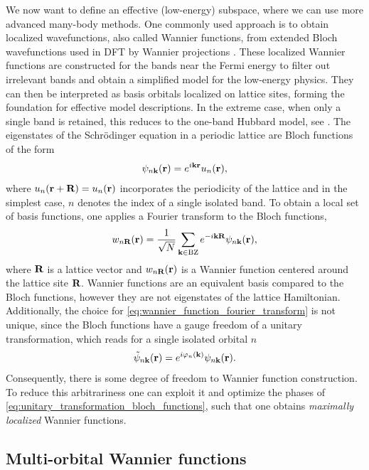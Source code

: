 \documentclass[../../main.tex]{subfiles}
\begin{document}
We now want to define an effective (low-energy) subspace, where we can use more advanced many-body methods. One commonly used approach is to obtain localized wavefunctions, also called Wannier functions, from extended Bloch wavefunctions used in DFT by Wannier projections \cite{Marzari1997}. These localized Wannier functions are constructed for the bands near the Fermi energy to filter out irrelevant bands and obtain a simplified model for the low-energy physics. They can then be interpreted as basis orbitals localized on lattice sites, forming the foundation for effective model descriptions. In the extreme case, when only a single band is retained, this reduces to the one-band Hubbard model, see . The eigenstates of the Schrödinger equation in a periodic lattice are Bloch functions of the form
\begin{align}
	\psi_{n\textbf{k}}(\textbf{r})=e^{i\textbf{kr}}u_n(\textbf{r}),
\end{align}
where $u_n(\textbf{r}+\textbf{R})=u_n(\textbf{r})$ incorporates the periodicity of the lattice and in the simplest case, $n$ denotes the index of a single isolated band. To obtain a local set of basis functions, one applies a Fourier transform to the Bloch functions,
\begin{align}\label{eq:wannier_function_fourier_transform}
	w_{n\textbf{R}}(\textbf{r})=\frac{1}{\sqrt{N}}\sum_{\textbf{k}\in\text{BZ}}e^{-i\textbf{kR}}\psi_{n\textbf{k}}(\textbf{r}),
\end{align}
where $\textbf{R}$ is a lattice vector and $w_{n\textbf{R}}(\textbf{r})$ is a Wannier function centered around the lattice site $\textbf{R}$. Wannier functions are an equivalent basis compared to the Bloch functions, however they are not eigenstates of the lattice Hamiltonian. Additionally, the choice for \eqref{eq:wannier_function_fourier_transform} is not unique, since the Bloch functions have a gauge freedom of a unitary transformation, which reads for a single isolated orbital $n$
\begin{align}\label{eq:unitary_transformation_bloch_functions}
	\tilde\psi_{n\textbf{k}}(\textbf{r})=e^{i\varphi_n(\textbf{k})}\psi_{n\textbf{k}}(\textbf{r}).
\end{align}
Consequently, there is some degree of freedom to Wannier function construction. To reduce this arbitrariness one can exploit it and optimize the phases of \eqref{eq:unitary_transformation_bloch_functions}, such that one obtains \textit{maximally localized} Wannier functions.

\subsection{Multi-orbital Wannier functions}
\end{document}
